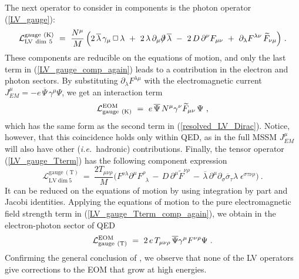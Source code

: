 \documentclass[12pt]{revtex4}
\newcommand{\slashed}[1]{\hbox{{$#1$}\llap{$/$}}}
\begin{document}
%
The next operator to consider in components is the photon operator
(\ref{LV_gauge}):
\begin{equation}
\label{LV_gauge_comp_again}
\mathcal{L}_{\mathrm{LV~dim~5}}^{\mathrm{gauge\ (K)}} 
 ~=~ \frac{N^\mu}{M}\,  
\Big( 
2\, \overline{\lambda}\,\gamma_\mu\, \Box\, 
   \lambda 
~+~
2\, \lambda\, \partial_\mu \slashed{\partial}\, 
   \overline{\lambda} 
~-~ 
2\, D\, \partial^\nu F_{\mu\nu}
~+~ 
\partial_\lambda F^{\lambda\nu}\, 
\widetilde{F}_{\nu\mu} 
\Big)~.
\end{equation}
%
These components are reducible on the equations of motion, 
and only the last term in (\ref{LV_gauge_comp_again})
leads to a contribution in the electron and photon sectors. 
By substituting $ \partial_\lambda F^{\lambda\mu} $ 
with the electromagnetic current 
$ J_{EM}^\mu=- e\, \overline{\Psi}\, \gamma^\mu \Psi $,
we get an interaction term
\begin{equation}
\label{LV_induced_by_gauge_K}
        \mathcal{L}_{\rm gauge\ (K)}^{\rm EOM} ~=~  
 e\, \overline{\Psi}\, N^\mu \gamma^\nu
\widetilde{F}_{\mu\nu}\, \Psi~,
\end{equation}
%
which  has the same form as the second term in (\ref{resolved_LV_Dirac}).
Notice, however, that this coincidence holds only within QED, 
as in the full MSSM $J_{EM}^\mu$ will also have other 
({\em i.e.}\ hadronic) contributions. Finally, the tensor operator
(\ref{LV_gauge_Tterm}) has the following component expression 
\begin{equation}
\mathcal{L}_{\mathrm{LV~dim~5}}^{\mathrm{gauge\ (T)}}  
      ~  =~ 
\frac{2T_{\mu\nu\rho}}{M}
\Big( 
F^{\nu\lambda}\partial^\mu F^\rho_{\phantom{\rho}\lambda}
\,-\, D\, \partial^\mu \widetilde{F}^{\nu\rho} 
\,-\,\overline{\lambda}\, \partial^\mu \partial_\sigma
\overline{\sigma}_\tau \lambda\; \epsilon^{\sigma\tau\nu\rho}
\Big)~.
\label{LV_gauge_Tterm_comp_again}
\end{equation}
It can be reduced on the equations of motion by using integration by
part and Jacobi identities.     
Applying the equations of motion to the pure
electromagnetic field strength term in 
(\ref{LV_gauge_Tterm_comp_again}), we obtain in the
electron-photon sector of QED
\begin{eqnarray}
        \mathcal{L}_{\rm gauge\ (T)}^{\rm EOM} ~=~   
\label{LV_induced_by_gauge_T}
        2\,e\,  T_{\mu\nu\rho} \, 
         \overline{\Psi} \gamma^\mu F^{\nu\rho} \Psi
        ~.
\end{eqnarray}
%
Confirming the general conclusion of \cite{GrootNibbelink:2004za}, we
observe that none of the LV operators give corrections to the EOM that
grow at high energies.  
\end{document}
